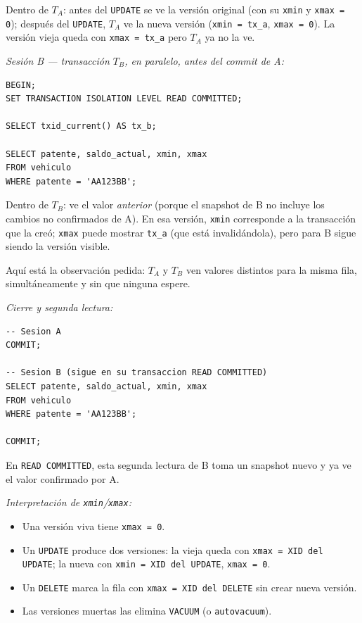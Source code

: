 \documentclass[11pt,a4paper]{article}
\begin{document}
Dentro de $T_A$: antes del \texttt{UPDATE} se ve la versión original (con su \texttt{xmin} y \texttt{xmax = 0}); después del \texttt{UPDATE}, $T_A$ ve la nueva versión (\texttt{xmin = tx\_a}, \texttt{xmax = 0}). La versión vieja queda con \texttt{xmax = tx\_a} pero $T_A$ ya no la ve.

\textit{Sesión B --- transacción $T_B$, en paralelo, antes del commit de A:}

\begin{lstlisting}
BEGIN;
SET TRANSACTION ISOLATION LEVEL READ COMMITTED;

SELECT txid_current() AS tx_b;

SELECT patente, saldo_actual, xmin, xmax
FROM vehiculo
WHERE patente = 'AA123BB';
\end{lstlisting}

Dentro de $T_B$: ve el valor \emph{anterior} (porque el snapshot de B no incluye los cambios no confirmados de A). En esa versión, \texttt{xmin} corresponde a la transacción que la creó; \texttt{xmax} puede mostrar \texttt{tx\_a} (que está invalidándola), pero para B sigue siendo la versión visible.

Aquí está la observación pedida: $T_A$ y $T_B$ ven valores distintos para la misma fila, simultáneamente y sin que ninguna espere.

\textit{Cierre y segunda lectura:}

\begin{lstlisting}
-- Sesion A
COMMIT;

-- Sesion B (sigue en su transaccion READ COMMITTED)
SELECT patente, saldo_actual, xmin, xmax
FROM vehiculo
WHERE patente = 'AA123BB';

COMMIT;
\end{lstlisting}

En \texttt{READ COMMITTED}, esta segunda lectura de B toma un snapshot nuevo y ya ve el valor confirmado por A.

\textit{Interpretación de \texttt{xmin}/\texttt{xmax}:}

\begin{itemize}
    \item Una versión viva tiene \texttt{xmax = 0}.
    \item Un \texttt{UPDATE} produce dos versiones: la vieja queda con \texttt{xmax = XID del UPDATE}; la nueva con \texttt{xmin = XID del UPDATE}, \texttt{xmax = 0}.
    \item Un \texttt{DELETE} marca la fila con \texttt{xmax = XID del DELETE} sin crear nueva versión.
    \item Las versiones muertas las elimina \texttt{VACUUM} (o \texttt{autovacuum}).
\end{itemize}
\end{document}
